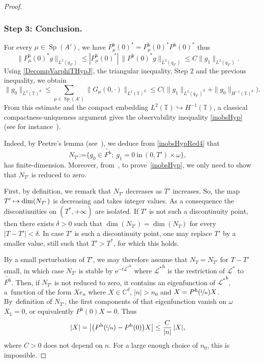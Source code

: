 \documentclass[10pt]{amsart}
\let\mathcal\mathscr
\def\mto{\mathchoice{\longmapsto}{\mapsto}{\mapsto}{\mapsto}}
\theoremstyle{plain}
\theoremstyle{definition}
\theoremstyle{remark}
\DeclareMathOperator{\Sp}{Sp}
\newcommand{\set}{\mathbb}
\renewcommand{\C}{\set{C}}
\newcommand{\T}{\set{T}}
\newcommand{\coloneqq}{\mathrel{\mathord{:}\mathord=}}
\newcommand{\h}{{\mathrm h}}
\newcommand{\eu}{\mathrm e}
\newcommand{\iu}{\mathrm i}
\let\originalleft\left
\let\originalright\right
\renewcommand{\left}{\mathopen{}\mathclose\bgroup\originalleft}
\renewcommand{\right}{\aftergroup\egroup\originalright}
\begin{document}
\begin{proof}
\subsubsection*{Step 3: Conclusion.}
For every $\mu \in \Sp(A')$, we have
$P^\h_\mu(0)^*=P^\h_\mu(0)^* P^\h(0)^*$ thus
\[
\|P^\h_\mu(0)^* g\|_{L^2(q_{T'})} \leq |P^\h_\mu(0)^*|\, \| P^\h(0)^* g\|_{L^2(q_{T'})} \leq C \|g_1\|_{L^2(q_{T'})}.
\]
Using \eqref{DecompVarphiTHypJ}, the triangular inequality, Step 2 and the previous inequality, we obtain
\begin{equation} \label{inobsHypRed4}
\|g_0\|_{L^2(\T)^d} \leq \sum_{\mu \in \Sp(A')} \|G_\mu(0,\cdot)\|_{L^2(\T)^d}
\leq C \bigl(\|g_1\|_{L^2(q_{T'})^d}+ \| g_0\|_{H^{-1}(\T)^d} \bigr).
\end{equation}
From this estimate and the compact embedding $L^2(\T) \hookrightarrow H^{-1}(\T)$, a classical com\-pact\-ness-uniqueness argument gives the observability inequality \eqref{inobsHyp} (see for instance~\cite[Lem.\,2.1 and Rem.\,2.2]{duprez_2018b}).

Indeed, by Peetre's lemma (see~\cite[Lem.\,3]{peetre_1961}), we deduce from \eqref{inobsHypRed4} that\vspace*{-3pt}
\[
N_{T'} \coloneqq \{g_{0} \in \widetilde{F^{\h}};\ g_{1} = 0\ \text{in}\ (0,T')\times\omega\},
\]
has finite-dimension. Moreover, from~\cite[Lem.\,4]{peetre_1961}, to prove~\eqref{inobsHyp}, we only need to show that $N_{T'}$ is reduced to zero.

First, by definition, we remark that $N_{T'}$ decreases as $T'$ increases. So, the map $T' \mto \dim(N_{T'})$ is decreasing and takes integer values. As a consequence the discontinuities on $(T^\ast,+\infty)$ are isolated. If $T'$ is not such a discontinuity point, then there exists $\delta>0$ such that $\dim(N_{T'})=\dim(N_{T})$ for every $|T-T'|<\delta$. In case $T'$ is such a discontinuity point, one may replace $T'$ by a smaller value, still such that $T'>T^\ast$, for which this holds.

By a small perturbation of $T'$, we may therefore assume that $N_T = N_{T'}$ for $T-T'$ small, in which case $N_{T'}$ is stable by $\eu^{-t {\mathcal{L}^*}^\h}$ where ${\mathcal{L}^*}^\h$ is the restriction of ${\mathcal{L}^*}$ to~$\widetilde{F^\h}$. Then, if $N_{T'}$ is not reduced to zero, it contains an eigenfunction of ${\mathcal{L}^*}^\h$, \ie a~function of the form $X e_n$ where $X \in \C^d$, $|n|>n_0$ and $X =P^\h\left(\sfrac{\iu}{n}\right) X$. By~definition of $N_{T'}$, the first components of that eigenfunction vanish on $\omega$ \ie $X_1=0$, or equivalently $P^\h(0)X=0$. Thus\vspace*{-3pt}
\[
|X| = \left| \left(P^\h\left(\sfrac{\iu}{n}\right) - P^\h (0) \right) X \right| \leq \frac{C}{|n|}\, |X|,
\]
where $C>0$ does not depend on $n$. For a large enough choice of $n_0$, this is impossible.
\end{proof}
\end{document}
